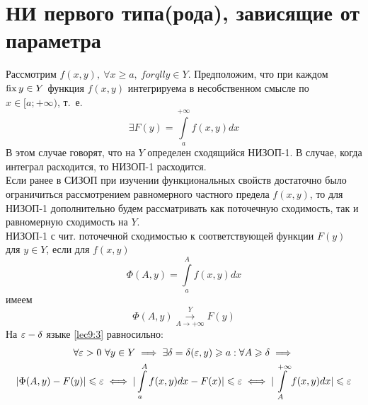 \documentclass[../../main.tex]{subfiles}
\begin{document}
\section{НИ первого типа(рода), зависящие от параметра}

Рассмотрим $ f(x, y),\ \forall x \geq a,\ forqll y \in Y $.
Предположим, что при каждом $ \operatorname{fix} y \in Y $ функция $ f(x, y) $
интегрируема в несобственном смысле по $ x \in [a; +\infty) $, т.~е.
\begin{equation}
\label{lec9:1}
\exists F(y) = \int\limits_a^{+\infty} f(x, y) dx
\end{equation}
В этом случае говорят, что на $ Y $ определен сходящийся НИЗОП-1.
В случае, когда интеграл расходится, то НИЗОП-1 расходится.\\
Если ранее в СИЗОП при изучении функциональных свойств достаточно
было ограничиться рассмотрением равномерного частного предела $ f(x, y) $,
то для НИЗОП-1 дополнительно будем рассматривать как поточечную сходимость,
так и равномерную сходимость на $ Y $.\\
НИЗОП-1 с чит. поточечной сходимостью к соответствующей функции $ F(y) $
для $ y \in Y $, если для $ f(x, y) $ 
\begin{equation}
\label{lec9:2}
\Phi(A, y) = \int\limits_a^A f(x, y) dx
\end{equation}
имеем
\begin{equation}
\label{lec9:3}
\Phi(A, y) \stackrel{Y}{\underset{A \to +\infty}{\to}} F(y)
\end{equation}
На $ \varepsilon-\delta $ языке \eqref{lec9:3} равносильно:
\begin{equation}
\label{lec9:4}
\begin{gathered}
\forall \varepsilon > 0\ \forall y \in Y \implies \exists \delta = \delta(\varepsilon, y)
\geqslant a:\forall A \geqslant \delta \implies\\ 
|\Phi(A, y) - F(y)| \leqslant \varepsilon \iff
|\int\limits_a^A f(x, y) dx - F(x)| \leqslant \varepsilon \iff
|\int\limits_A^{+\infty} f(x, y) dx| \leqslant \varepsilon
\end{gathered}
\end{equation}
\end{document}
